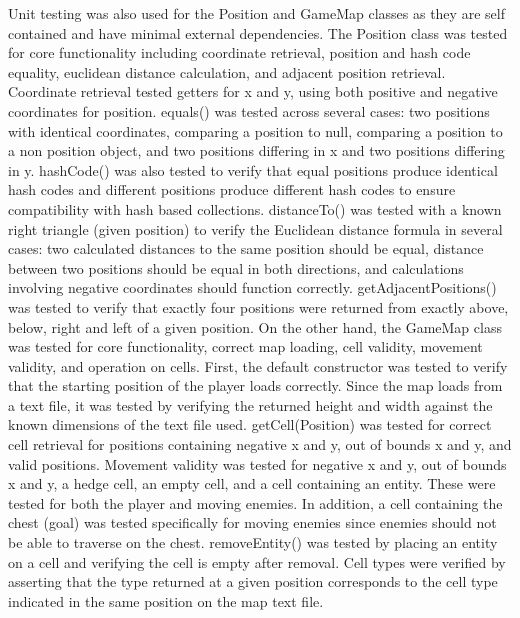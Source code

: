 \documentclass[12pt,letterpaper]{article}
\begin{document}
Unit testing was also used for the Position and GameMap classes as they are self contained and have minimal external dependencies. The Position class was tested for core functionality including coordinate retrieval, position and hash code equality, euclidean distance calculation, and adjacent position retrieval. Coordinate retrieval tested getters for x and y, using both positive and negative coordinates for position. equals() was tested across several cases: two positions with identical coordinates, comparing a position to null, comparing a position to a non position object, and two positions differing in x and two positions differing in y. hashCode() was also tested to verify that equal positions produce identical hash codes and different positions produce different hash codes to ensure compatibility with hash based collections. distanceTo() was tested with a known right triangle (given position) to verify the Euclidean distance formula in several cases: two calculated distances to the same position should be equal, distance between two positions should be equal in both directions, and calculations involving negative coordinates should function correctly. getAdjacentPositions() was tested to verify that exactly four positions were returned from exactly above, below, right and left of a given position. On the other hand, the GameMap class was tested for core functionality, correct map loading, cell validity, movement validity, and operation on cells. First, the default constructor was tested to verify that the starting position of the player loads correctly. Since the map loads from a text file, it was tested by verifying the returned height and width against the known dimensions of the text file used. getCell(Position) was tested for correct cell retrieval for positions containing negative x and y, out of bounds x and y, and valid positions. Movement validity was tested for negative x and y, out of bounds x and y, a hedge cell, an empty cell, and a cell containing an entity. These were tested for both the player and moving enemies. In addition, a cell containing the chest (goal) was tested specifically for moving enemies since enemies should not be able to traverse on the chest. removeEntity() was tested by placing an entity on a cell and verifying the cell is empty after removal. Cell types were verified by asserting that the type returned at a given position corresponds to the cell type indicated in the same position on the map text file.
\end{document}
